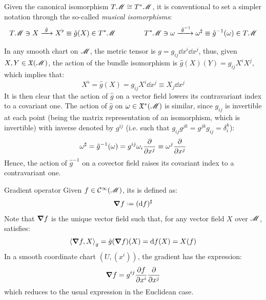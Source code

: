 Given the canonical isomorphism $ T\mathscr{M} \cong T^*\mathscr{M} $, it is conventional to set a simpler notation through the so-called \emph{musical isomorphisms}:
\begin{equation*}
  T\mathscr{M} \ni X \xrightarrow{\ \hat{g} \ } X^\flat \equiv \hat{g}(X) \in T^*\mathscr{M}
  \qquad \qquad
  T^*\mathscr{M} \ni \omega \xrightarrow{\ \hat{g}^{-1}} \omega^\sharp \equiv \hat{g}^{-1}(\omega) \in T\mathscr{M}
\end{equation*}

In any smooth chart on $ \mathscr{M} $, the metric tensor is $ g = g_{ij} \dd x^i \dd x^j $, thus, given $ X,Y \in \mathfrak{X}(\mathscr{M}) $, the action of the bundle isomorphism is $ \hat{g}(X)(Y) = g_{ij} X^i X^j $, which implies that:
\begin{equation}
  X^\flat = \hat{g}(X) = g_{ij} X^i \dd x^j \equiv X_j \dd x^j
\end{equation}
It is then clear that the action of $ \hat{g} $ on a vector field lowers its contravariant index to a covariant one. The action of $ \hat{g} $ on $ \omega \in \mathfrak{X}^*(\mathscr{M}) $ is similar, since $ g_{ij} $ is invertible at each point (being the matrix representation of an isomorphism, which is invertible) with inverse denoted by $ g^{ij} $ (i.e. such that $ g_{ij} g^{jk} = g^{jk} g_{ij} = \delta^k_i $):
\begin{equation}
  \omega^\sharp = \hat{g}^{-1}(\omega) = g^{ij} \omega_i \frac{\partial}{\partial x^j} \equiv \omega^j \frac{\partial}{\partial x^j}
\end{equation}
Hence, the action of $ \hat{g}^{-1} $ on a covector field raises its covariant index to a contravariant one.

\begin{example}{Gradient operator}{}
  Given $ f \in \mathcal{C}^{\infty}(\mathscr{M}) $, its  is defined as:
  \begin{equation}
    \grad f \defeq (\dd f)^\sharp
  \end{equation}
  Note that $ \boldsymbol{\nabla} f $ is the unique vector field such that, for any vector field $ X $ over $ \mathscr{M} $, satisfies:
  \begin{equation*}
    \braket{\boldsymbol{\nabla} f , X}_g = \hat{g}(\boldsymbol{\nabla} f)(X) = \mathrm{d} f(X) = X(f)
  \end{equation*}
  In a smooth coordinate chart $ (U,(x^i)) $, the gradient has the expression:
  \begin{equation*}
    \boldsymbol{\nabla} f = g^{ij} \frac{\partial f}{\partial x^i} \frac{\partial}{\partial x^j}
  \end{equation*}
  which reduces to the usual expression in the Euclidean case.
\end{example}

